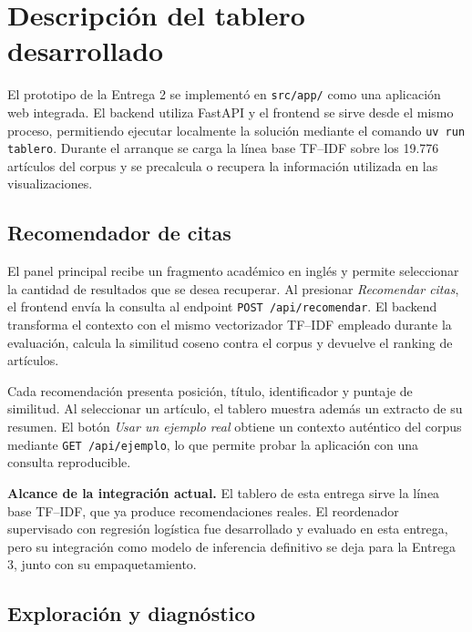 \documentclass[11pt]{article}
\newcommand{\notabox}[1]{%
  \begin{tcolorbox}[colback=lightgray, colframe=accentblue, boxrule=0.6pt,
    left=8pt, right=8pt, top=5pt, bottom=5pt, arc=2pt]
    \small #1
  \end{tcolorbox}
}
\begin{document}
\section{Descripción del tablero desarrollado}

El prototipo de la Entrega 2 se implementó en \texttt{src/app/} como una aplicación web integrada. El backend utiliza FastAPI y el frontend se sirve desde el mismo proceso, permitiendo ejecutar localmente la solución mediante el comando \texttt{uv run tablero}. Durante el arranque se carga la línea base TF--IDF sobre los 19.776 artículos del corpus y se precalcula o recupera la información utilizada en las visualizaciones.

\subsection{Recomendador de citas}

El panel principal recibe un fragmento académico en inglés y permite seleccionar la cantidad de resultados que se desea recuperar. Al presionar \emph{Recomendar citas}, el frontend envía la consulta al endpoint \texttt{POST /api/recomendar}. El backend transforma el contexto con el mismo vectorizador TF--IDF empleado durante la evaluación, calcula la similitud coseno contra el corpus y devuelve el ranking de artículos.

Cada recomendación presenta posición, título, identificador y puntaje de similitud. Al seleccionar un artículo, el tablero muestra además un extracto de su resumen. El botón \emph{Usar un ejemplo real} obtiene un contexto auténtico del corpus mediante \texttt{GET /api/ejemplo}, lo que permite probar la aplicación con una consulta reproducible.

\notabox{\textbf{Alcance de la integración actual.} El tablero de esta entrega sirve la línea base TF--IDF, que ya produce recomendaciones reales. El reordenador supervisado con regresión logística fue desarrollado y evaluado en esta entrega, pero su integración como modelo de inferencia definitivo se deja para la Entrega 3, junto con su empaquetamiento.}

\subsection{Exploración y diagnóstico}
\end{document}
